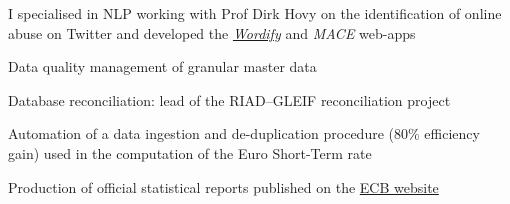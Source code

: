 \documentclass[]{cv_template}
\begin{document}
\begin{minipage}[t]{0.62\textwidth}
I specialised in NLP working with Prof Dirk Hovy on the identification of online abuse on Twitter and developed the \href{https://wordify.unibocconi.it/}{\it Wordify} and \textit{MACE} web-apps
\sectionsep


\begin{tightemize}
\item Data quality management of granular master data
\item Database reconciliation: lead of the RIAD–GLEIF reconciliation project
\item Automation of a data ingestion and de-duplication procedure (80\% efficiency gain) used in the computation of the Euro Short-Term rate
\item Production of official statistical reports published on the \href{https://www.ecb.europa.eu/stats/financial_corporations/list_of_financial_institutions/html/index.en.html}{ECB website}
\end{tightemize}




%
%

\end{minipage}
\hfill
\end{document}
